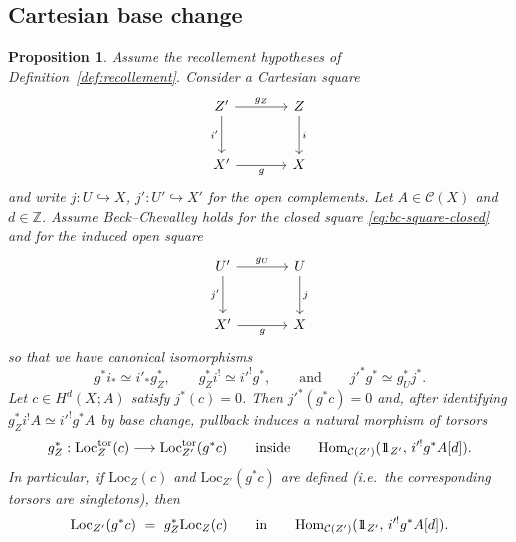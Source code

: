 \documentclass[10pt,a4paper,dvipsnames,x11names]{amsart}
\newcommand{\one}{1\hskip-3.5pt1}
\newcommand{\C}{\mathcal C}
\newcommand{\Hom}{\mathrm{Hom}}
\newcommand{\Loc}{\mathrm{Loc}}
\numberwithin{equation}{section}
\theoremstyle{plain}
\newtheorem{proposition}[proposition]{Proposition}
\theoremstyle{definition}
\theoremstyle{remark}
\begin{document}
\subsection{Cartesian base change}

\begin{proposition} \label{prop:Loc-bc}
Assume the recollement hypotheses of Definition~\ref{def:recollement}. Consider a Cartesian square
\begin{equation}\label{eq:bc-square-closed}
\begin{tikzcd}[row sep=large, column sep=large]
Z' \arrow[r,"g_Z"] \arrow[d,"i'"'] & Z \arrow[d,"i"]\\
X' \arrow[r,"g"'] & X
\end{tikzcd}
\end{equation}
and write $j:U\hookrightarrow X$, $j':U'\hookrightarrow X'$ for the open complements.
Let $A\in\C(X)$ and $d\in\mathbb Z$.
Assume Beck--Chevalley holds for the closed square \eqref{eq:bc-square-closed} and for the induced open square
\begin{equation*}
\begin{tikzcd}[row sep=large, column sep=large]
U' \arrow[r,"g_U"] \arrow[d,"j'"'] & U \arrow[d,"j"]\\
X' \arrow[r,"g"'] & X
\end{tikzcd}
\end{equation*}
so that we have canonical isomorphisms
$$
g^*i_*\simeq i'_*g_Z^*,\qquad g_Z^*i^!\simeq i'^!g^*,
\qquad\text{and}\qquad
j'^*g^*\simeq g_U^*j^*.
$$
Let $c\in H^d(X;A)$ satisfy $j^*(c)=0$. Then $j'^*(g^*c)=0$ and, after identifying
$g_Z^*i^!A\simeq i'^!g^*A$ by base change, pullback induces a natural morphism of torsors
$$
g_Z^*:\Loc_Z^{\mathrm{tor}}(c)\longrightarrow \Loc_{Z'}^{\mathrm{tor}}(g^*c)
\qquad\text{inside}\qquad
\Hom_{\C(Z')}(\one_{Z'},\,i'^!g^*A[d]).
$$
In particular, if $\Loc_Z(c)$ and $\Loc_{Z'}(g^*c)$ are defined (i.e.\ the corresponding torsors are singletons), then
$$
\Loc_{Z'}(g^*c)\ =\ g_Z^*\Loc_Z(c)
\qquad\text{in}\qquad
\Hom_{\C(Z')}(\one_{Z'},\,i'^!g^*A[d]).
$$
\end{proposition}
\end{document}

